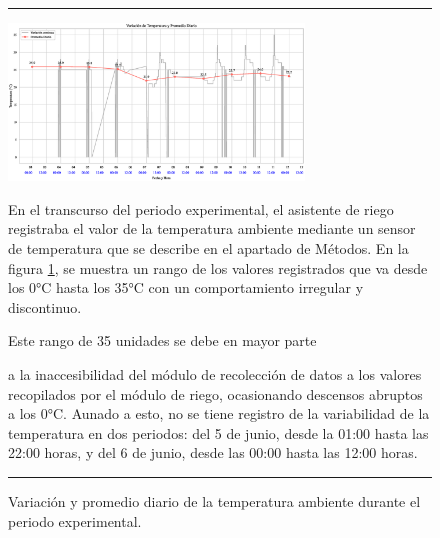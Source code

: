 \documentclass[pdflatex,sn-mathphys-num]{sn-jnl}%
\theoremstyle{thmstyleone}%
\theoremstyle{thmstyletwo}%
\theoremstyle{thmstylethree}%
\begin{document}
\begin{figure}[!ht]
    \hrule
    \centering
    \includegraphics[width=0.7\textwidth]{assets/temperatura_continua_y_promedio.eps}
    \caption{Variación y promedio diario de la temperatura ambiente durante el periodo experimental.}
    \label{fig:temperatura_promedio}

    \vspace{0.4cm}

    \noindent
    \begin{minipage}[t]{0.49\textwidth}
        \justifying
        En el transcurso del periodo experimental, el asistente de riego registraba el valor de la temperatura ambiente mediante un sensor de temperatura que se describe en el apartado de Métodos. En la figura \ref{fig:temperatura_promedio}, se muestra un rango de los valores registrados que va desde los 0°C hasta los 35°C con un comportamiento irregular y discontinuo.

        Este rango de 35 unidades se debe en mayor parte
    \end{minipage}%
    \hfill
    \begin{minipage}[t]{0.49\textwidth}
        \justifying
\noindent a la inaccesibilidad del módulo de recolección de datos a los valores recopilados por el módulo de riego, ocasionando descensos abruptos a los 0°C. Aunado a esto, no se tiene registro de la variabilidad de la temperatura en dos periodos: del 5 de junio, desde la 01:00 hasta las 22:00 horas, y del 6 de junio, desde las 00:00 hasta las 12:00 horas.
    
	\end{minipage}

    \vspace{0.5cm}
    \hrule
\end{figure}
\end{document}
